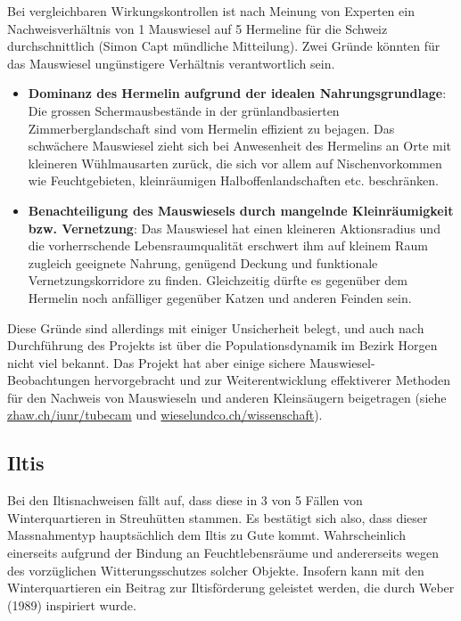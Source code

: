 \documentclass[
  oneside]{scrbook}
\providecommand{\tightlist}{%
  \setlength{\itemsep}{0pt}\setlength{\parskip}{0pt}}
\begin{document}
Bei vergleichbaren Wirkungskontrollen ist nach Meinung von Experten ein Nachweisverhältnis von 1 Mauswiesel auf 5 Hermeline für die Schweiz durchschnittlich (Simon Capt mündliche Mitteilung).
Zwei Gründe könnten für das Mauswiesel ungünstigere Verhältnis verantwortlich sein.

\begin{itemize}
\tightlist
\item
  \textbf{Dominanz des Hermelin aufgrund der idealen Nahrungsgrundlage}: Die grossen Schermausbestände in der grünlandbasierten Zimmerberglandschaft sind vom Hermelin effizient zu bejagen. Das schwächere Mauswiesel zieht sich bei Anwesenheit des Hermelins an Orte mit kleineren Wühlmausarten zurück, die sich vor allem auf Nischenvorkommen wie Feuchtgebieten, kleinräumigen Halboffenlandschaften etc. beschränken.
\item
  \textbf{Benachteiligung des Mauswiesels durch mangelnde Kleinräumigkeit bzw. Vernetzung}: Das Mauswiesel hat einen kleineren Aktionsradius und die vorherrschende Lebensraumqualität erschwert ihm auf kleinem Raum zugleich geeignete Nahrung, genügend Deckung und funktionale Vernetzungskorridore zu finden. Gleichzeitig dürfte es gegenüber dem Hermelin noch anfälliger gegenüber Katzen und anderen Feinden sein.
\end{itemize}

Diese Gründe sind allerdings mit einiger Unsicherheit belegt, und auch nach Durchführung des Projekts ist über die Populationsdynamik im Bezirk Horgen nicht viel bekannt. Das Projekt hat aber einige sichere Mauswiesel-Beobachtungen hervorgebracht und zur Weiterentwicklung effektiverer Methoden für den Nachweis von Mauswieseln und anderen Kleinsäugern beigetragen (siehe \href{https://www.zhaw.ch/iunr/tubecam}{zhaw.ch/iunr/tubecam} und \href{http://wieselundco.ch/wissenschaft}{wieselundco.ch/wissenschaft}).

\hypertarget{iltis}{%
\subsection{Iltis}\label{iltis}}

Bei den Iltisnachweisen fällt auf, dass diese in 3 von 5 Fällen von Winterquartieren in Streuhütten stammen. Es bestätigt sich also, dass dieser Massnahmentyp hauptsächlich dem Iltis zu Gute kommt. Wahrscheinlich einerseits aufgrund der Bindung an Feuchtlebensräume und andererseits wegen des vorzüglichen Witterungsschutzes solcher Objekte. Insofern kann mit den Winterquartieren ein Beitrag zur Iltisförderung geleistet werden, die durch Weber (1989) inspiriert wurde.
\end{document}
